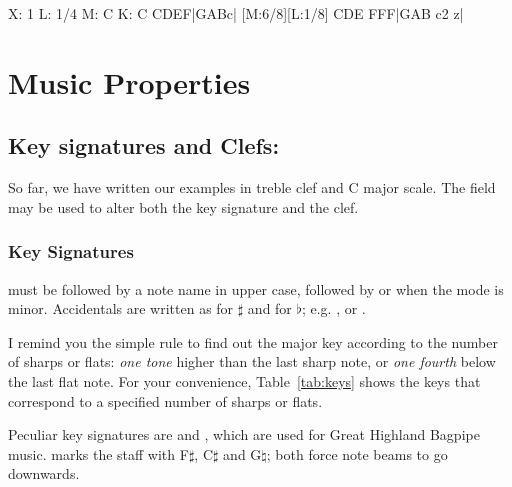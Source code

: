 \documentclass[a4paper,fullpage,12pt]{book}
\begin{document}
\begin{abcsource}
X: 1
L: 1/4
M: C
K: C
CDEF|GABc| [M:6/8][L:1/8] CDE FFF|GAB c2 z|
\end{abcsource}





\section{Music Properties}

\subsection{Key signatures and Clefs: }
\label{sec:clefs}

So far, we have written our examples in treble clef and C major scale.
The  field may be used to alter both the key signature and
the clef.


\subsubsection{Key Signatures}

 must be followed by a note name in upper case, followed by
 or  when the mode is minor. Accidentals are written as
\car{\#} for $\sharp$ and  for $\flat$; e.g. , or
.

I remind you the simple rule to find out the major key according to
the number of sharps or flats: \emph{one tone} higher than the last
sharp note, or \emph{one fourth} below the last flat note. For your
convenience, Table~\ref{tab:keys} shows the keys that correspond to a
specified number of sharps or flats.

Peculiar key signatures are  and , which are
used for Great Highland Bagpipe music.  marks the staff
with F$\sharp$, C$\sharp$ and G$\natural$; both force note beams to go
downwards.
\end{document}
